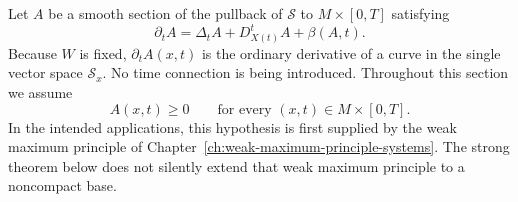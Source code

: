 \documentclass[10pt]{coll-l}
\theoremstyle{definition}
\theoremstyle{remark}
\numberwithin{section}{chapter}
\numberwithin{equation}{chapter}
\begin{document}
Let $A$ be a smooth section of the pullback of $\mathcal S$ to
$M\times[0,T]$ satisfying
\begin{equation}
 \partial_tA
   =\Delta_tA+D^t_{X(t)}A+\beta(A,t).                    \label{eq:smp-system}
\end{equation}
Because $W$ is fixed, $\partial_tA(x,t)$ is the ordinary derivative of a
curve in the single vector space $\mathcal S_x$.  No time connection is
being introduced.  Throughout this section we assume
\begin{equation}
                  A(x,t)\geq0
       \qquad\text{for every }(x,t)\in M\times[0,T].      \label{eq:smp-solution-nonnegative}
\end{equation}
In the intended applications, this hypothesis is first supplied by the weak
maximum principle of Chapter~\ref{ch:weak-maximum-principle-systems}.  The
strong theorem below does not silently extend that weak maximum principle
to a noncompact base.
\end{document}
